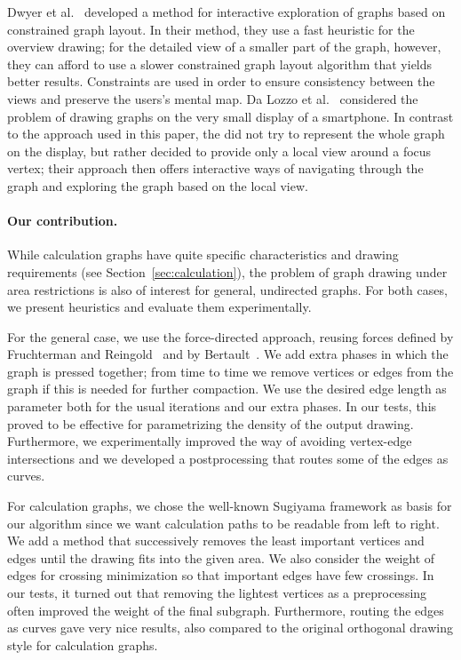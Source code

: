 \documentclass[]{llncs}
\begin{document}
Dwyer et al.~\cite{dwyerea2008overview+detail} developed a method for
interactive exploration of graphs based on constrained graph layout.
In their method, they use a fast heuristic for the overview drawing;
for the detailed view of a smaller part of the graph, however, they
can afford to use a slower constrained graph layout algorithm that
yields better results. Constraints are used in order to ensure
consistency between the views and preserve the users's mental map.
Da Lozzo et al.~\cite{JGAA-252} considered the problem of drawing
graphs on the very small display of a smartphone. In contrast to the
approach used in this paper, the did not try to represent the whole
graph on the display, but rather decided to provide only a local view
around a focus vertex; their approach then offers interactive ways of
navigating through the graph and exploring the graph based on the
local view.





\paragraph{Our contribution.} 
While calculation graphs have quite specific characteristics and
drawing requirements (see Section~\ref{sec:calculation}), the problem
of graph drawing under area restrictions is also of interest for
general, undirected graphs.  For both cases, we present heuristics
and evaluate them experimentally.

For the general case, we use the force-directed approach, reusing
forces defined by Fruchterman and Reingold~\cite{Fruchterman1991} and
by Bertault~\cite{Bertault2000}.
We add extra phases in which the graph is pressed together;
from time to time we remove vertices or edges from the graph if this
is needed for further compaction. We use the desired edge length as
parameter both for the usual iterations and our extra phases.
In our tests, this proved to be effective for parametrizing
the density of the output drawing. Furthermore, we experimentally
improved the way of avoiding vertex-edge intersections and we
developed a postprocessing that routes some of the edges as curves.

For calculation graphs, we chose the well-known Sugiyama framework
\cite{sugiyama1981methods} as basis
for our algorithm since we want calculation paths to be readable
from left to right. We add a method that successively removes the
least important vertices and edges until the drawing fits into the
given area.  We also consider the
weight of edges for crossing minimization so that important edges have
few crossings. In our tests, it turned out that removing the lightest
vertices as a preprocessing often improved the weight of the final
subgraph. Furthermore, routing the edges as curves gave very nice
results, also compared to the original orthogonal drawing style for
calculation graphs.
\end{document}
